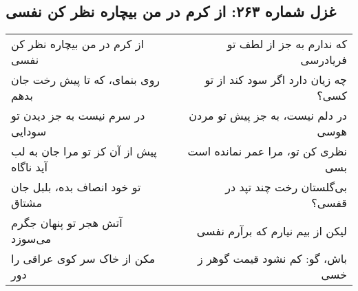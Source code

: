 \begin{center}
\section*{غزل شماره ۲۶۳: از کرم در من بیچاره نظر کن نفسی}
\label{sec:263}
\begin{longtable}{l p{0.5cm} r}
از کرم در من بیچاره نظر کن نفسی
&&
که ندارم به جز از لطف تو فریادرسی
\\
روی بنمای، که تا پیش رخت جان بدهم
&&
چه زیان دارد اگر سود کند از تو کسی؟
\\
در سرم نیست به جز دیدن تو سودایی
&&
در دلم نیست، به جز پیش تو مردن هوسی
\\
پیش از آن کز تو مرا جان به لب آید ناگاه
&&
نظری کن تو، مرا عمر نمانده است بسی
\\
تو خود انصاف بده، بلبل جان مشتاق
&&
بی‌گلستان رخت چند تپد در قفسی؟
\\
آتش هجر تو پنهان جگرم می‌سوزد
&&
لیکن از بیم نیارم که برآرم نفسی
\\
مکن از خاک سر کوی عراقی را دور
&&
باش، گو: کم نشود قیمت گوهر ز خسی
\\
\end{longtable}
\end{center}
